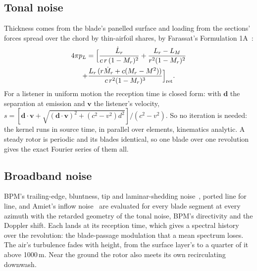 \documentclass[10pt,a4paper,twocolumn]{article}
\begin{document}
\subsection{Tonal noise}
Thickness comes from the blade's panelled surface and loading from the sections' forces spread over the chord by thin-airfoil shares, by Farassat's Formulation 1A~\cite{farassat}:
\begin{multline}
4\pi p_L = \Bigl[\frac{\dot L_r}{c\,r\,(1-M_r)^2} + \frac{L_r - L_M}{r^2(1-M_r)^2}\\
+ \frac{L_r\,(r\dot M_r + c(M_r - M^2))}{c\,r^2(1-M_r)^3}\Bigr]_{\rm ret} .
\end{multline}
For a listener in uniform motion the reception time is closed form: with $\mathbf{d}$ the separation at emission and $\mathbf{v}$ the listener's velocity, $s=[\mathbf{d}\cdot\mathbf{v}+\sqrt{(\mathbf{d}\cdot\mathbf{v})^2+(c^2-v^2)d^2}]/(c^2-v^2)$. So no iteration is needed: the kernel runs in source time, in parallel over elements, kinematics analytic. A steady rotor is periodic and its blades identical, so one blade over one revolution gives the exact Fourier series of them all.

\subsection{Broadband noise}
BPM's trailing-edge, bluntness, tip and laminar-shedding noise~\cite{bpm}, ported line for line, and Amiet's inflow noise~\cite{amiet} are evaluated for every blade segment at every azimuth with the retarded geometry of the tonal noise, BPM's directivity and the Doppler shift. Each lands at its reception time, which gives a spectral history over the revolution: the blade-passage modulation that a mean spectrum loses. The air's turbulence fades with height, from the surface layer's to a quarter of it above 1000\,m. Near the ground the rotor also meets its own recirculating downwash.
\end{document}
